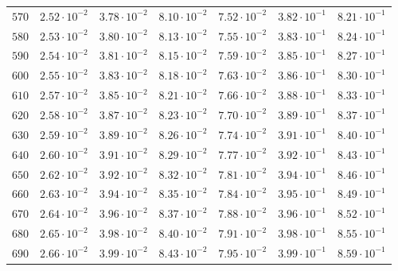 \begin{table}[h]
\begin{tabular}{lcccccc}
$	570	$ & $	2.52 \cdot 10^{-2}	$ & $	3.78 \cdot 10^{-2}	$ & $	8.10 \cdot 10^{-2}	$ & $	7.52 \cdot 10^{-2}	$ & $	3.82 \cdot 10^{-1}	$ & $	8.21 \cdot 10^{-1}	$ \\
$	580	$ & $	2.53 \cdot 10^{-2}	$ & $	3.80 \cdot 10^{-2}	$ & $	8.13 \cdot 10^{-2}	$ & $	7.55 \cdot 10^{-2}	$ & $	3.83 \cdot 10^{-1}	$ & $	8.24 \cdot 10^{-1}	$ \\
$	590	$ & $	2.54 \cdot 10^{-2}	$ & $	3.81 \cdot 10^{-2}	$ & $	8.15 \cdot 10^{-2}	$ & $	7.59 \cdot 10^{-2}	$ & $	3.85 \cdot 10^{-1}	$ & $	8.27 \cdot 10^{-1}	$ \\
$	600	$ & $	2.55 \cdot 10^{-2}	$ & $	3.83 \cdot 10^{-2}	$ & $	8.18 \cdot 10^{-2}	$ & $	7.63 \cdot 10^{-2}	$ & $	3.86 \cdot 10^{-1}	$ & $	8.30 \cdot 10^{-1}	$ \\
$	610	$ & $	2.57 \cdot 10^{-2}	$ & $	3.85 \cdot 10^{-2}	$ & $	8.21 \cdot 10^{-2}	$ & $	7.66 \cdot 10^{-2}	$ & $	3.88 \cdot 10^{-1}	$ & $	8.33 \cdot 10^{-1}	$ \\
$	620	$ & $	2.58 \cdot 10^{-2}	$ & $	3.87 \cdot 10^{-2}	$ & $	8.23 \cdot 10^{-2}	$ & $	7.70 \cdot 10^{-2}	$ & $	3.89 \cdot 10^{-1}	$ & $	8.37 \cdot 10^{-1}	$ \\
$	630	$ & $	2.59 \cdot 10^{-2}	$ & $	3.89 \cdot 10^{-2}	$ & $	8.26 \cdot 10^{-2}	$ & $	7.74 \cdot 10^{-2}	$ & $	3.91 \cdot 10^{-1}	$ & $	8.40 \cdot 10^{-1}	$ \\
$	640	$ & $	2.60 \cdot 10^{-2}	$ & $	3.91 \cdot 10^{-2}	$ & $	8.29 \cdot 10^{-2}	$ & $	7.77 \cdot 10^{-2}	$ & $	3.92 \cdot 10^{-1}	$ & $	8.43 \cdot 10^{-1}	$ \\
$	650	$ & $	2.62 \cdot 10^{-2}	$ & $	3.92 \cdot 10^{-2}	$ & $	8.32 \cdot 10^{-2}	$ & $	7.81 \cdot 10^{-2}	$ & $	3.94 \cdot 10^{-1}	$ & $	8.46 \cdot 10^{-1}	$ \\
$	660	$ & $	2.63 \cdot 10^{-2}	$ & $	3.94 \cdot 10^{-2}	$ & $	8.35 \cdot 10^{-2}	$ & $	7.84 \cdot 10^{-2}	$ & $	3.95 \cdot 10^{-1}	$ & $	8.49 \cdot 10^{-1}	$ \\
$	670	$ & $	2.64 \cdot 10^{-2}	$ & $	3.96 \cdot 10^{-2}	$ & $	8.37 \cdot 10^{-2}	$ & $	7.88 \cdot 10^{-2}	$ & $	3.96 \cdot 10^{-1}	$ & $	8.52 \cdot 10^{-1}	$ \\
$	680	$ & $	2.65 \cdot 10^{-2}	$ & $	3.98 \cdot 10^{-2}	$ & $	8.40 \cdot 10^{-2}	$ & $	7.91 \cdot 10^{-2}	$ & $	3.98 \cdot 10^{-1}	$ & $	8.55 \cdot 10^{-1}	$ \\
$	690	$ & $	2.66 \cdot 10^{-2}	$ & $	3.99 \cdot 10^{-2}	$ & $	8.43 \cdot 10^{-2}	$ & $	7.95 \cdot 10^{-2}	$ & $	3.99 \cdot 10^{-1}	$ & $	8.59 \cdot 10^{-1}	$ \\

\end{tabular}
\end{table}
